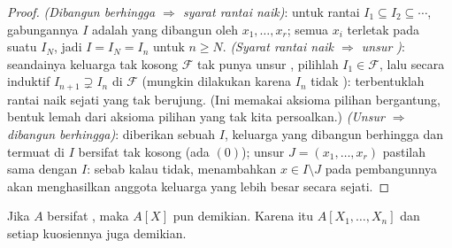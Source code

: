 \begin{proof}
\emph{(Dibangun berhingga $\Rightarrow$ syarat rantai naik)}: untuk rantai $I_1 \subseteq I_2
\subseteq \cdots$, gabungannya $I$ adalah  yang dibangun oleh $x_1,
\dots, x_r$; semua $x_i$ terletak pada suatu $I_N$, jadi $I = I_N = I_n$ untuk
$n \geq N$. \emph{(Syarat rantai naik $\Rightarrow$ unsur )}: seandainya
keluarga tak kosong $\mathcal F$ tak punya unsur , pilihlah $I_1 \in
\mathcal F$, lalu secara induktif $I_{n+1} \supsetneq I_n$ di
$\mathcal F$ (mungkin dilakukan karena $I_n$ tidak ): terbentuklah rantai naik
sejati yang tak berujung. (Ini memakai aksioma pilihan bergantung,
bentuk lemah dari aksioma pilihan yang tak kita persoalkan.)
\emph{(Unsur  $\Rightarrow$ dibangun berhingga)}: diberikan sebuah  $I$,
keluarga  yang dibangun berhingga dan termuat di $I$ bersifat
tak kosong (ada $(0)$); unsur  $J = (x_1, \dots, x_r)$ pastilah
sama dengan $I$: sebab kalau tidak, menambahkan $x \in I \setminus J$ pada
pembangunnya akan menghasilkan anggota keluarga yang lebih besar secara sejati.
\end{proof}

\begin{theorem}\label{thm:b3:rings:hilbert}
Jika $A$ bersifat , maka $A[X]$ pun demikian. Karena itu $A[X_1, \dots,
X_n]$ dan setiap kuosiennya juga demikian.
\end{theorem}

